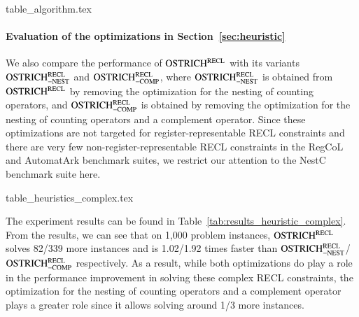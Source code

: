 \begin{table}[htbp]
  {table_algorithm.tex}
  \caption{Evaluation of the technical choices and optimizations in Section~\ref{sec:algorithm}}\label{tab:results_algorithm}
\end{table}


\paragraph*{Evaluation of the optimizations in Section~\ref{sec:heuristic}}
%
We also compare the performance of $\rm OSTRICH^{RECL}$ with its variants $\rm OSTRICH^{RECL}_{\rm -NEST}$ and $\rm OSTRICH^{RECL}_{\rm -COMP}$, where $\rm OSTRICH^{RECL}_{\rm -NEST}$ is obtained from $\rm OSTRICH^{RECL}$ by removing the optimization for the nesting of counting operators, and $\rm OSTRICH^{RECL}_{\rm -COMP}$ is obtained by removing the optimization for the nesting of counting operators and a complement operator. Since these optimizations are not targeted for register-representable RECL constraints and there are very few non-register-representable RECL constraints in the RegCoL and AutomatArk benchmark suites, we restrict our attention to the NestC benchmark suite here. 

\begin{table}[htbp]
  {table_heuristics_complex.tex}
  \caption{Evaluation of the optimizations in Section~\ref{sec:heuristic}}\label{tab:results_heuristic_complex}
\end{table}

The experiment results can be found in Table~\ref{tab:results_heuristic_complex}. From the results, we can see that on 1,000 problem instances, $\rm OSTRICH^{RECL}$ solves 82/339 more instances and is 1.02/1.92 times faster than $\rm OSTRICH^{RECL}_{\rm -NEST}$/$\rm OSTRICH^{RECL}_{\rm -COMP}$ respectively. As a result, while both optimizations do play a role in the performance improvement in solving these complex RECL constraints, the optimization for the nesting of counting operators and a complement operator plays a greater role since it allows solving around 1/3 more instances. 

